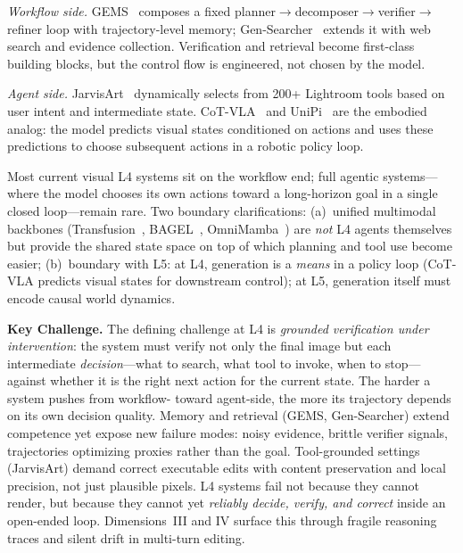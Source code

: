 \documentclass{llmxive}
\begin{document}
\textit{Workflow side.} GEMS~\citep{he2026gems} composes a fixed planner$\to$decomposer$\to$verifier$\to$refiner loop with trajectory-level memory; Gen-Searcher~\citep{feng2026gen} extends it with web search and evidence collection. Verification and retrieval become first-class building blocks, but the control flow is engineered, not chosen by the model.

\textit{Agent side.} JarvisArt~\citep{lin2025jarvisart} dynamically selects from 200+ Lightroom tools based on user intent and intermediate state. CoT-VLA~\citep{zhao2025cotvla} and UniPi~\citep{du2023unipi} are the embodied analog: the model predicts visual states conditioned on actions and uses these predictions to choose subsequent actions in a robotic policy loop.

Most current visual L4 systems sit on the workflow end; full agentic systems---where the model chooses its own actions toward a long-horizon goal in a single closed loop---remain rare. Two boundary clarifications: (a)~unified multimodal backbones (Transfusion~\citep{zhou2024transfusion}, BAGEL~\citep{deng2025bagelemerging}, OmniMamba~\citep{zou2025omnimamba}) are \emph{not} L4 agents themselves but provide the shared state space on top of which planning and tool use become easier; (b)~boundary with L5: at L4, generation is a \emph{means} in a policy loop (CoT-VLA predicts visual states for downstream control); at L5, generation itself must encode causal world dynamics.

\textbf{Key Challenge.} The defining challenge at L4 is \emph{grounded verification under intervention}: the system must verify not only the final image but each intermediate \emph{decision}---what to search, what tool to invoke, when to stop---against whether it is the right next action for the current state. The harder a system pushes from workflow- toward agent-side, the more its trajectory depends on its own decision quality. Memory and retrieval (GEMS, Gen-Searcher) extend competence yet expose new failure modes: noisy evidence, brittle verifier signals, trajectories optimizing proxies rather than the goal. Tool-grounded settings (JarvisArt) demand correct executable edits with content preservation and local precision, not just plausible pixels. L4 systems fail not because they cannot render, but because they cannot yet \emph{reliably decide, verify, and correct} inside an open-ended loop.  Dimensions~III and IV surface this through fragile reasoning traces and silent drift in multi-turn editing.
\end{document}
